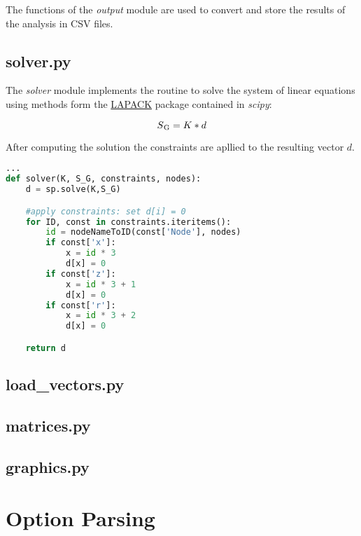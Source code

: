 The functions of the \textit{output} module are used to convert and store the results of the analysis in CSV files.

\subsection{solver.py}
\label{subsec:solver.py}

The \textit{solver} module implements the routine to solve the system of linear equations using methods form the \href{http://www.netlib.org/lapack/}{LAPACK} package contained in \textit{scipy}:

\begin{equation}
S\textsubscript{G} = K * d
\end{equation}

After computing the solution the constraints are apllied to the resulting vector $d$.

\begin{inconsolata}
\begin{lstlisting}[language=python]
...
def solver(K, S_G, constraints, nodes):
    d = sp.solve(K,S_G)

    #apply constraints: set d[i] = 0
    for ID, const in constraints.iteritems():
        id = nodeNameToID(const['Node'], nodes)
        if const['x']:
            x = id * 3
            d[x] = 0
        if const['z']:
            x = id * 3 + 1
            d[x] = 0
        if const['r']:
            x = id * 3 + 2
            d[x] = 0

    return d
\end{lstlisting}
\end{inconsolata}

\subsection{load\_vectors.py}
\label{subsec:loadvectors.py}


\subsection{matrices.py}
\label{subsec:matrices.py}


\subsection{graphics.py}
\label{subsec:graphics.py}


\pagebreak

\section{Option Parsing}
\label{sec:optparse}


